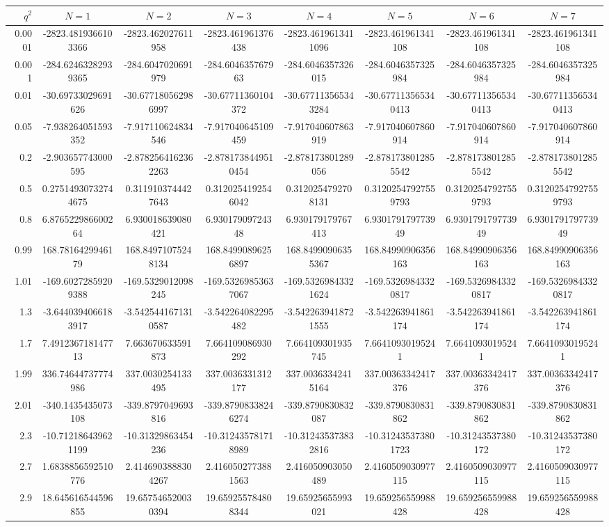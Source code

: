 \documentclass{standalone}
\begin{document}
\begin{tabular} {r|ccccccc}
\hline
$q^2$&$N=1$&$N=2$&$N=3$&$N=4$&$N=5$&$N=6$&$N=7$\\
\hline
0.0001&-2823.4819366103366&-2823.462027611958&-2823.461961376438&-2823.4619613411096&-2823.461961341108&-2823.461961341108&-2823.461961341108\\
0.001&-284.62463282939365&-284.6047020691979&-284.604635767963&-284.6046357326015&-284.6046357325984&-284.6046357325984&-284.6046357325984\\
0.01&-30.69733029691626&-30.677180562986997&-30.67711360104372&-30.677113565343284&-30.677113565340413&-30.677113565340413&-30.677113565340413\\
0.05&-7.938264051593352&-7.917110624834546&-7.917040645109459&-7.917040607863919&-7.917040607860914&-7.917040607860914&-7.917040607860914\\
0.2&-2.903657743000595&-2.8782564162362263&-2.8781738449510454&-2.878173801289056&-2.8781738012855542&-2.8781738012855542&-2.8781738012855542\\
0.5&0.27514930732744675&0.3119103744427643&0.3120254192546042&0.3120254792708131&0.31202547927559793&0.31202547927559793&0.31202547927559793\\
0.8&6.876522986600264&6.930018639080421&6.93017909724348&6.930179179767413&6.930179179773949&6.930179179773949&6.930179179773949\\
0.99&168.7816429946179&168.84971075248134&168.84990896256897&168.84990906355367&168.84990906356163&168.84990906356163&168.84990906356163\\
1.01&-169.60272859209388&-169.5329012098245&-169.53269853637067&-169.53269843321624&-169.53269843320817&-169.53269843320817&-169.53269843320817\\
1.3&-3.6440394066183917&-3.5425441671310587&-3.542264082295482&-3.5422639418721555&-3.542263941861174&-3.542263941861174&-3.542263941861174\\
1.7&7.491236718147713&7.663670633591873&7.664109086930292&7.664109301935745&7.66410930195241&7.66410930195241&7.66410930195241\\
1.99&336.74644737774986&337.0030254133495&337.0036331312177&337.00363342415164&337.00363342417376&337.00363342417376&337.00363342417376\\
2.01&-340.1435435073108&-339.8797049693816&-339.87908338246274&-339.8790830832087&-339.8790830831862&-339.8790830831862&-339.8790830831862\\
2.3&-10.712186439621199&-10.31329863454236&-10.312435781718989&-10.312435373832816&-10.312435373801723&-10.31243537380172&-10.31243537380172\\
2.7&1.6838856592510776&2.4146903888304267&2.4160502773881563&2.416050903050489&2.4160509030977115&2.4160509030977115&2.4160509030977115\\
2.9&18.645616544596855&19.657546520030394&19.659255784808344&19.65925655993021&19.659256559988428&19.659256559988428&19.659256559988428\\
\hline
\end{tabular}
\end{document}
